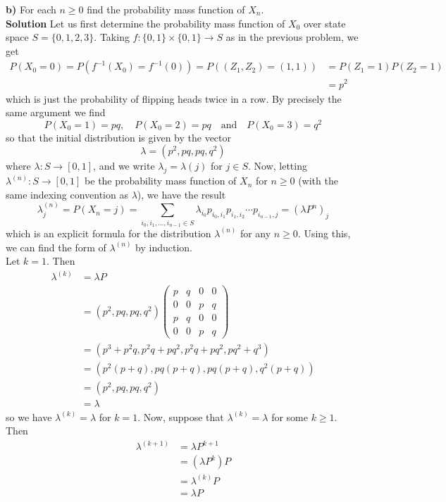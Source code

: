 \documentclass[11pt, letterpaper]{article}
\begin{document}
{\bf b)} For each $n\geq 0$ find the probability mass function of $X_n$.\\[10pt]
{\bf Solution} Let us first determine the probability mass function of $X_0$ over state space $S=\{0,1,2,3\}$. Taking $f:\{0,1\}\times\{0,1\}\rightarrow S$ as
in the previous problem, we get
\begin{align*}
    P(X_0=0)=P(f^{-1}(X_0)=f^{-1}(0))=P((Z_1,Z_2)=(1,1))&=P(Z_1=1)P(Z_2=1)\tag{independence of flips}\\
    &=p^2
\end{align*}
which is just the probability of flipping heads twice in a row. By precisely the same argument we find
\[P(X_0=1)=pq,\quad P(X_0=2)=pq\quad\text{and}\quad P(X_0=3)=q^2\]
so that the initial distribution is given by the vector
\[\lambda=(p^2,pq,pq,q^2)\]
where $\lambda:S\rightarrow [0,1]$, and we write $\lambda_j=\lambda(j)$ for $j\in S$. Now, letting $\lambda^{(n)}:S\rightarrow[0,1]$ be the probability mass function of $X_n$ for $n\geq 0$ (with the same indexing convention as $\lambda$), we have the result
\[\lambda^{(n)}_j=P(X_n=j)=\sum_{i_0,i_1,\dots,i_{n-1}\in S}\lambda_{i_0}p_{i_0,i_1}p_{i_1,i_2}\cdots p_{i_{n-1},j}=(\lambda P^n)_j\]
which is an explicit formula for the distribution $\lambda^{(n)}$ for any $n\geq 0$. Using this, we can find the form of $\lambda^{(n)}$ by induction.\\[10pt]
Let $k=1$. Then
\begin{align*}
    \lambda^{(k)}&=\lambda P\\
    &=(p^2,pq,pq,q^2)\begin{pmatrix}
       p & q & 0 & 0\\
       0 & 0 & p & q\\ 
       p & q & 0 & 0\\
       0 & 0 & p & q
    \end{pmatrix}\\
    &=(p^3+p^2q,p^2q+pq^2,p^2q+pq^2,pq^2+q^3)\\
    &=(p^2(p+q), pq(p+q), pq(p+q), q^2(p+q))\\
    &=(p^2,pq, pq, q^2)\tag{$p+q=p+1-p=1$}\\
    &=\lambda
\end{align*}
so we have $\lambda^{(k)}=\lambda$ for $k=1$. Now, suppose that $\lambda^{(k)}=\lambda$ for some $k\geq 1$. Then
\begin{align*}
    \lambda^{(k+1)}&=\lambda P^{k+1}\\
    &=(\lambda P^k)P\tag{associativity}\\
    &=\lambda^{(k)}P\\
    &=\lambda P\tag{inductive hypothesis}
\end{align*}
\end{document}

